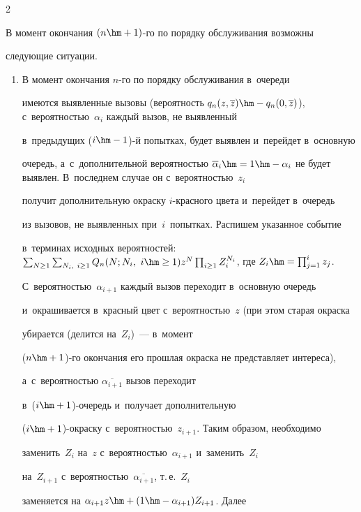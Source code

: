 \begin{multicols}{2}
  


  В момент окончания $(n\hm+1)$-го по порядку обслуживания возможны 


следующие ситуации.


  \begin{enumerate}


  \item В момент окончания $n$-го по порядку обслуживания в~очереди 


имеются выявленные вызовы (ве\-роят\-ность $q_n(z,\overline{z})\hm- 


q_n(0,\overline{z})$), с~ве\-ро\-ят\-ностью~$\alpha_i$ каждый вызов, не выявленный 


в~предыду\-щих ($i\hm-1$)-й попытках, будет выявлен и~перейдет в~основную 


очередь, а~с~дополнительной вероятностью $\overline{\alpha}_i\hm= 1\hm- 


\alpha_i$ не будет выявлен. В~последнем случае он с~вероятностью~$z_i$ 


получит дополнительную окраску $i$-крас\-но\-го цвета и~перейдет в~очередь 


из вызовов, не выявленных при~$i$~попытках. Распишем указанное событие 


в~терминах исходных вероятностей: $\sum\nolimits_{N\geq1} 


\sum\nolimits_{N_i,\ i\geq1} Q_n(N; N_i,\ i\hm\geq1) z^N \prod\nolimits_{i\geq 1} 


Z_i^{N_i}$, где $Z_i\hm= \prod\nolimits^i_{j=1} z_j$. 


С~ве\-ро\-ят\-ностью~$\alpha_{i+1}$ каждый вызов переходит в~основную очередь 


и~окрашивается в~красный цвет с~ве\-ро\-ят\-ностью~$z$ (при этом старая окраска 


убирается (делится на~$Z_i$)~--- в~момент  


($n\hm+1$)-го окончания его прошлая окрас\-ка не представляет интереса), 


а~с~вероятностью $\overline{\alpha_{i+1}}$ вызов переходит  


в~($i\hm+1$)-очередь и~получает дополнительную  


($i\hm+1$)-окраску с~ве\-ро\-ят\-ностью~$z_{i+1}$. Таким образом, необходимо 


заменить~$Z_i$ на~$z$ с~ве\-ро\-ят\-ностью~$\alpha_{i+1}$ и~заменить~$Z_i$ 


на~$Z_{i+1}$ с~вероятностью~$\overline{\alpha_{i+1}}$, т.\,е.~$Z_i$ 


заменяется на $\alpha_{i+1} z\hm+ (1\hm- \alpha_{i+1})Z_{i+1}$. Далее 



\end{enumerate}
\end{multicols}
